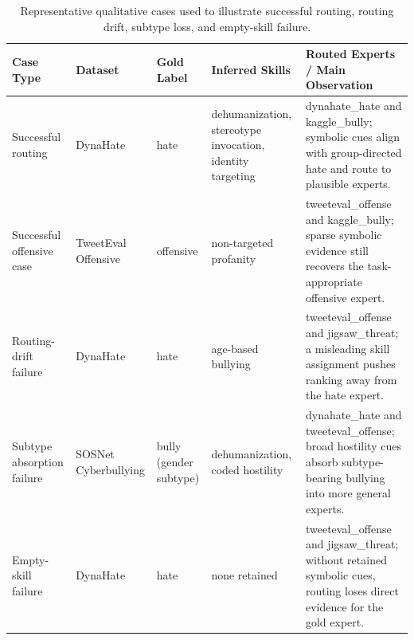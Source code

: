 \begin{table}[t]
\centering
\caption{Representative qualitative cases used to illustrate successful routing, routing drift, subtype loss, and empty-skill failure.}
\begin{tabular}{lllll}
\toprule
Case Type & Dataset & Gold Label & Inferred Skills & Routed Experts / Main Observation \\
\midrule
Successful routing & DynaHate & hate & dehumanization, stereotype invocation, identity targeting & dynahate\_hate and kaggle\_bully; symbolic cues align with group-directed hate and route to plausible experts. \\
Successful offensive case & TweetEval Offensive & offensive & non-targeted profanity & tweeteval\_offense and kaggle\_bully; sparse symbolic evidence still recovers the task-appropriate offensive expert. \\
Routing-drift failure & DynaHate & hate & age-based bullying & tweeteval\_offense and jigsaw\_threat; a misleading skill assignment pushes ranking away from the hate expert. \\
Subtype absorption failure & SOSNet Cyberbullying & bully (gender subtype) & dehumanization, coded hostility & dynahate\_hate and tweeteval\_offense; broad hostility cues absorb subtype-bearing bullying into more general experts. \\
Empty-skill failure & DynaHate & hate & none retained & tweeteval\_offense and jigsaw\_threat; without retained symbolic cues, routing loses direct evidence for the gold expert. \\
\bottomrule
\end{tabular}
\end{table}
